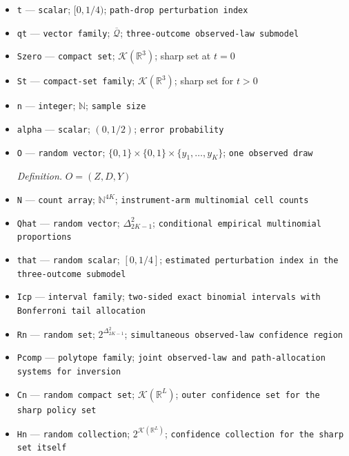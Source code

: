 \documentclass{article}
\begin{document}
\begin{itemize}
  \par\smallskip\noindent\emph{Definition.} Hausdorff distance induced by \(\|\cdot\|_\infty\)
  \item \texttt{t} --- \texttt{scalar}; \([0,1/4)\); \texttt{path-\allowbreak{}drop perturbation index}
  \item \texttt{qt} --- \texttt{vector family}; \(\overline{\mathcal Q}\); \texttt{three-\allowbreak{}outcome observed-\allowbreak{}law submodel}
  \item \texttt{Szero} --- \texttt{compact set}; \(\mathcal K(\mathbb R^3)\); sharp set at \(t=0\)
  \item \texttt{St} --- \texttt{compact-\allowbreak{}set family}; \(\mathcal K(\mathbb R^3)\); sharp set for \(t>0\)
  \item \texttt{n} --- \texttt{integer}; \(\mathbb N\); \texttt{sample size}
  \item \texttt{alpha} --- \texttt{scalar}; \((0,1/2)\); \texttt{error probability}
  \item \texttt{O} --- \texttt{random vector}; \(\{0,1\}\times\{0,1\}\times\{y_1,\ldots,y_K\}\); \texttt{one observed draw}
  \par\smallskip\noindent\emph{Definition.} \(O=(Z,D,Y)\)
  \item \texttt{N} --- \texttt{count array}; \(\mathbb N^{4K}\); \texttt{instrument-\allowbreak{}arm multinomial cell counts}
  \item \texttt{Qhat} --- \texttt{random vector}; \(\Delta_{2K-1}^2\); \texttt{conditional empirical multinomial proportions}
  \item \texttt{that} --- \texttt{random scalar}; \([0,1/4]\); \texttt{estimated perturbation index in the three-\allowbreak{}outcome submodel}
  \item \texttt{Icp} --- \texttt{interval family}; \texttt{two-\allowbreak{}sided exact binomial intervals with Bonferroni tail allocation}
  \item \texttt{Rn} --- \texttt{random set}; \(2^{\Delta_{2K-1}^2}\); \texttt{simultaneous observed-\allowbreak{}law confidence region}
  \item \texttt{Pcomp} --- \texttt{polytope family}; \texttt{joint observed-\allowbreak{}law and path-\allowbreak{}allocation systems for inversion}
  \item \texttt{Cn} --- \texttt{random compact set}; \(\mathcal K(\mathbb R^L)\); \texttt{outer confidence set for the sharp policy set}
  \item \texttt{Hn} --- \texttt{random collection}; \(2^{\mathcal K(\mathbb R^L)}\); \texttt{confidence collection for the sharp set itself}

\end{itemize}
\end{document}
